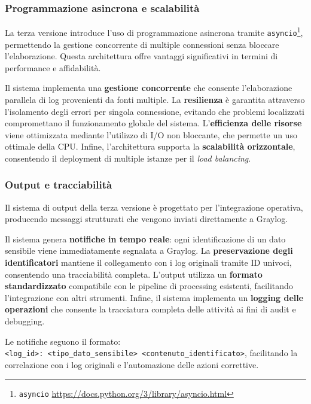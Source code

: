 \documentclass[12pt,twoside]{report}
\begin{document}
\subsubsection{Programmazione asincrona e scalabilità}
\label{subsubsec:ver3_asincrona}

La terza versione introduce l'uso di programmazione asincrona tramite \texttt{asyncio}\footnote{\texttt{asyncio} \url{https://docs.python.org/3/library/asyncio.html}}, permettendo la gestione concorrente di multiple connessioni senza bloccare l'elaborazione. Questa architettura offre vantaggi significativi in termini di performance e affidabilità.

Il sistema implementa una \textbf{gestione concorrente} che consente l'elaborazione parallela di log provenienti da fonti multiple. La \textbf{resilienza} è garantita attraverso l'isolamento degli errori per singola connessione, evitando che problemi localizzati compromettano il funzionamento globale del sistema. L'\textbf{efficienza delle risorse} viene ottimizzata mediante l'utilizzo di I/O non bloccante, che permette un uso ottimale della CPU. Infine, l'architettura supporta la \textbf{scalabilità orizzontale}, consentendo il deployment di multiple istanze per il \textit{load balancing}.

\subsubsection{Output e tracciabilità}
\label{subsubsec:ver3_output}

Il sistema di output della terza versione è progettato per l'integrazione operativa, producendo messaggi strutturati che vengono inviati direttamente a Graylog.

Il sistema genera \textbf{notifiche in tempo reale}: ogni identificazione di un dato sensibile viene immediatamente segnalata a Graylog. La \textbf{preservazione degli identificatori} mantiene il collegamento con i log originali tramite ID univoci, consentendo una tracciabilità completa. L'output utilizza un \textbf{formato standardizzato} compatibile con le pipeline di processing esistenti, facilitando l'integrazione con altri strumenti. Infine, il sistema implementa un \textbf{logging delle operazioni} che consente la tracciatura completa delle attività ai fini di audit e debugging.

Le notifiche seguono il formato:\\
\texttt{<log\_id>: <tipo\_dato\_sensibile> <contenuto\_identificato>}, facilitando la correlazione con i log originali e l'automazione delle azioni correttive.
\end{document}
